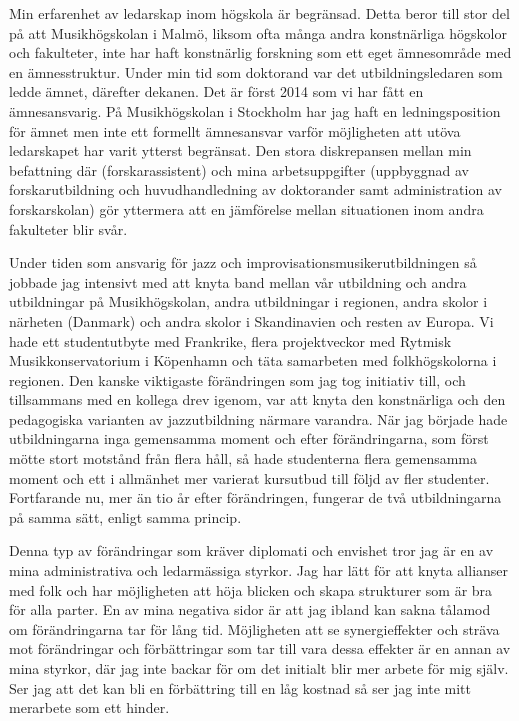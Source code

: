 \documentclass[a4paper]{article}
\begin{document}
Min erfarenhet av ledarskap inom högskola är begränsad. Detta beror till stor del på att Musikhögskolan i Malmö, liksom ofta många andra konstnärliga högskolor och fakulteter, inte har haft konstnärlig forskning som ett eget ämnesområde med en ämnesstruktur. Under min tid som doktorand var det utbildningsledaren som ledde ämnet, därefter dekanen. Det är först 2014 som vi har fått en ämnesansvarig. På Musikhögskolan i Stockholm har jag haft en ledningsposition för ämnet men inte ett formellt ämnesansvar varför möjligheten att utöva ledarskapet har varit ytterst begränsat. Den stora diskrepansen mellan min befattning där (forskarassistent) och mina arbetsuppgifter (uppbyggnad av forskarutbildning och huvudhandledning av doktorander samt administration av forskarskolan) gör yttermera att en jämförelse mellan situationen inom andra fakulteter blir svår.

Under tiden som ansvarig för jazz och improvisationsmusikerutbildningen så jobbade jag intensivt med att knyta band mellan vår utbildning och andra utbildningar på Musikhögskolan, andra utbildningar i regionen, andra skolor i närheten (Danmark) och andra skolor i Skandinavien och resten av Europa. Vi hade ett studentutbyte med Frankrike, flera projektveckor med Rytmisk Musikkonservatorium i Köpenhamn och täta samarbeten med folkhögskolorna i regionen. Den kanske viktigaste förändringen som jag tog initiativ till, och tillsammans med en kollega drev igenom, var att knyta den konstnärliga och den pedagogiska varianten av jazzutbildning närmare varandra. När jag började hade utbildningarna inga gemensamma moment och efter förändringarna, som först mötte stort motstånd från flera håll, så hade studenterna flera gemensamma moment och ett i allmänhet mer varierat kursutbud till följd av fler studenter. Fortfarande nu, mer än tio år efter förändringen, fungerar de två utbildningarna på samma sätt, enligt samma princip.

Denna typ av förändringar som kräver diplomati och envishet tror jag är en av mina administrativa och ledarmässiga styrkor. Jag har lätt för att knyta allianser med folk och har möjligheten att höja blicken och skapa strukturer som är bra för alla parter. En av mina negativa sidor är att jag ibland kan sakna tålamod om förändringarna tar för lång tid. Möjligheten att se synergieffekter och sträva mot förändringar och förbättringar som tar till vara dessa effekter är en annan av mina styrkor, där jag inte backar för om det initialt blir mer arbete för mig själv. Ser jag att det kan bli en förbättring till en låg kostnad så ser jag inte mitt merarbete som ett hinder.
\end{document}
